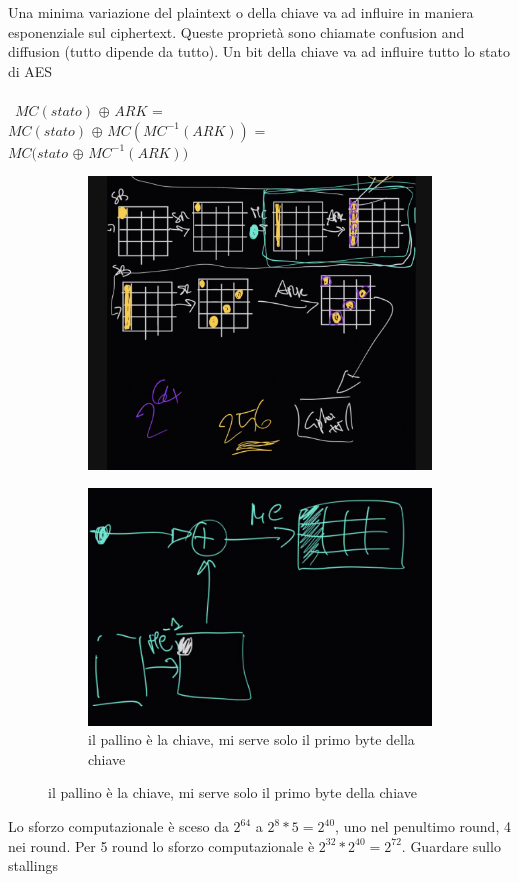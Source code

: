 \documentclass[11pt, oneside]{article}   	%
\begin{document}
Una minima variazione del plaintext o della chiave va ad influire in maniera esponenziale sul ciphertext. Queste proprietà sono chiamate confusion and diffusion (tutto dipende da tutto). Un bit della chiave va ad influire tutto lo stato di AES\\\\\
$MC(stato)$ $\oplus$ $ARK$ = \\$MC(stato)$ $\oplus$ $MC(MC^{-1}(ARK))$ = \\$MC(stato$ $\oplus$ $MC^{-1}(ARK))$
\begin{figure}[H]
\begin{subfigure}[h]{0.5\linewidth}
\includegraphics[width=\linewidth]{rev}
\end{subfigure}
\hfill
\begin{subfigure}[h]{0.5\linewidth}
\includegraphics[width=\linewidth]{rev2}
\caption*{il pallino è la chiave, mi serve solo il primo byte della chiave}
\end{subfigure}%
\end{figure}
Lo sforzo computazionale è sceso da $2^{64}$ a $2^8* 5 = 2^{40}$, uno nel penultimo round, 4 nei round.
Per 5 round lo sforzo computazionale è $2^{32} * 2^{40} = 2^{72}$.
Guardare sullo stallings\\ \\
\end{document}
